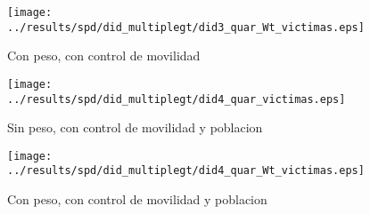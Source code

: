 \documentclass[11pt,letterpaper]{article}
\begin{document}
\begin{figure}[H]
\caption{Con peso, con control de movilidad}
\centering
\texttt{[image: ../results/spd/did\_multiplegt/did3\_quar\_Wt\_victimas.eps]}
\end{figure}
\begin{figure}[H]
\caption{Sin peso, con control de movilidad y poblacion}
\centering
\texttt{[image: ../results/spd/did\_multiplegt/did4\_quar\_victimas.eps]}
\end{figure}

\begin{figure}[H]
\caption{Con peso, con control de movilidad y poblacion}
\centering
\texttt{[image: ../results/spd/did\_multiplegt/did4\_quar\_Wt\_victimas.eps]}
\end{figure}
\end{document}
